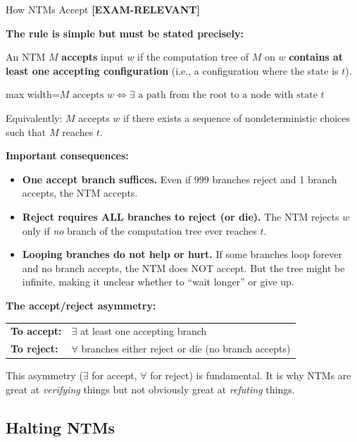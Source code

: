 \documentclass[11pt,a4paper]{article}
\newcommand{\fitmath}[1]{\begin{adjustbox}{max width=\linewidth}$\displaystyle #1$\end{adjustbox}}
\newcommand{\kemark}{\textcolor{red!70!black}{\textbf{[EXAM-RELEVANT]}}}
\begin{document}
\begin{conceptbox}{How NTMs Accept \kemark}

\textbf{The rule is simple but must be stated precisely:}

An NTM $M$ \textbf{accepts} input $w$ if the computation tree of $M$ on $w$ \textbf{contains at least one accepting configuration} (i.e., a configuration where the state is $t$).

\fitmath{M \text{ accepts } w \iff \exists \text{ a path from the root to a node with state } t}

Equivalently: $M$ accepts $w$ if there exists a sequence of nondeterministic choices such that $M$ reaches $t$.

\textbf{Important consequences:}
\begin{itemize}[nosep]
\item \textbf{One accept branch suffices.} Even if 999 branches reject and 1 branch accepts, the NTM accepts.
\item \textbf{Reject requires ALL branches to reject (or die).} The NTM rejects $w$ only if \textit{no} branch of the computation tree ever reaches $t$.
\item \textbf{Looping branches do not help or hurt.} If some branches loop forever and no branch accepts, the NTM does NOT accept. But the tree might be infinite, making it unclear whether to ``wait longer'' or give up.
\end{itemize}

\textbf{The accept/reject asymmetry:}

\begin{center}
\begin{tabular}{ll}
\toprule
\textbf{To accept:} & $\exists$ at least one accepting branch \\
\textbf{To reject:} & $\forall$ branches either reject or die (no branch accepts) \\
\bottomrule
\end{tabular}
\end{center}

This asymmetry ($\exists$ for accept, $\forall$ for reject) is fundamental. It is why NTMs are great at \textit{verifying} things but not obviously great at \textit{refuting} things.
\end{conceptbox}

\subsection{Halting NTMs}
\end{document}
